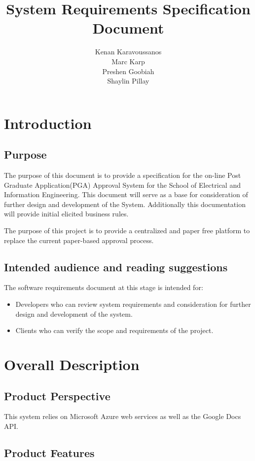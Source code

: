 \documentclass[]{article}
\title{System Requirements Specification Document}
\author{
	Kenan Karavoussanos \\Marc Karp \\Preshen Goobiah \\Shaylin Pillay }
\begin{document}
\maketitle
\newpage
\tableofcontents\newpage
\section{Introduction}

\subsection{Purpose}
The purpose of this document is to provide a specification for the on-line Post Graduate Application(PGA) Approval System for the School of Electrical and Information Engineering. This document will serve as a base for consideration of further design and development of the System. Additionally this documentation will provide initial elicited business rules. 

The purpose of this project is to provide a centralized and paper free platform to replace the current paper-based approval process.  

\subsection{Intended audience and reading suggestions}

The software requirements document at this stage is intended for:
\begin{itemize}
\item	Developers who can review system requirements and consideration for further design and development of the system.
\item	Clients who can verify the scope and requirements of the project.
\end{itemize}

\section{Overall Description}

\subsection{Product Perspective}

This system relies on Microsoft Azure web services as well as the Google Docs API.


\subsection{Product Features}
\end{document}
